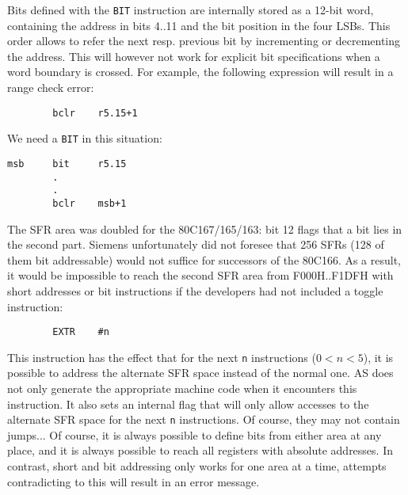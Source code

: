 \documentclass[12pt,twoside]{report}
\newcommand{\tty}[1]{{\tt #1}}
\newcommand{\asname}{{AS}}
\begin{document}
Bits defined with the \tty{BIT} instruction are internally stored as a
12-bit word, containing the address in bits 4..11 and the bit
position in the four LSBs.  This order allows to refer the next resp.
previous bit by incrementing or decrementing the address.  This will
however not work for explicit bit specifications when a word boundary
is crossed.  For example, the following expression will result in a
range check error:
\begin{verbatim}
        bclr    r5.15+1
\end{verbatim}
We need a \tty{BIT} in this situation:
\begin{verbatim}
msb     bit     r5.15
        .
        .
        bclr    msb+1
\end{verbatim}
The SFR area was doubled for the 80C167/165/163: bit 12 flags that a bit
lies in the second part.  Siemens unfortunately did not foresee that
256 SFRs (128 of them bit addressable) would not suffice for
successors of the 80C166.  As a result, it would be impossible to
reach the second SFR area from F000H..F1DFH with short addresses or
bit instructions if the developers had not included a toggle
instruction:
\begin{verbatim}
        EXTR    #n
\end{verbatim}
This instruction has the effect that for the next \tty{n} instructions
($0<n<5$), it is possible to address the alternate SFR space instead of
the normal one.  \asname{} does not only generate the appropriate machine
code when it encounters this instruction.  It also sets an internal
flag that will only allow accesses to the alternate SFR space for
the next \tty{n} instructions.  Of course, they may not contain jumps...
Of course, it is always possible to define bits from either area at
any place, and it is always possible to reach all registers with
absolute addresses.  In contrast, short and bit addressing only works
for one area at a time, attempts contradicting to this will result in
an error message.
\end{document}
